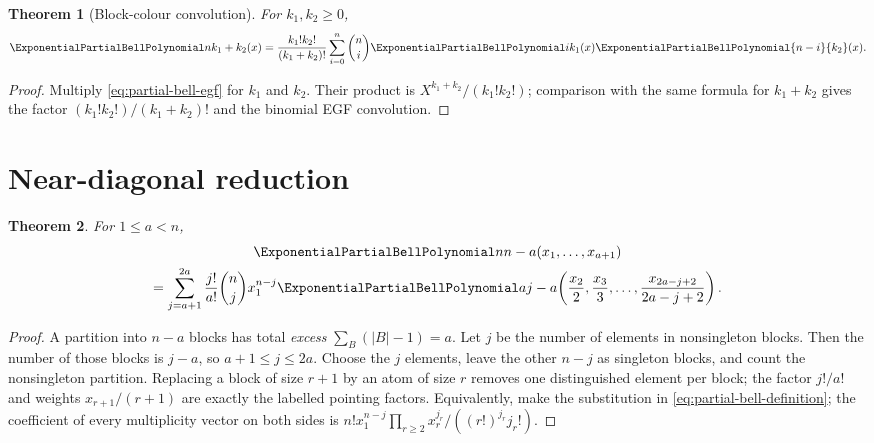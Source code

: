 \documentclass[11pt,a4paper,oneside,openany]{book}
\newtheorem{theorem}{Theorem}[chapter]
\theoremstyle{definition}
\theoremstyle{remark}
\begin{document}
\begin{theorem}[Block-colour convolution]\label{thm:bell-partial-convolution}
For $k_1,k_2\ge0$,
\begin{equation}\label{eq:bell-partial-convolution}
 \ExponentialPartialBellPolynomial n{k_1+k_2}(x)
 =\frac{k_1!k_2!}{(k_1+k_2)!}
 \sum_{i=0}^{n}\binom ni\ExponentialPartialBellPolynomial i{k_1}(x)\ExponentialPartialBellPolynomial{n-i}{k_2}(x).
\end{equation}
\end{theorem}
\begin{proof}
Multiply \eqref{eq:partial-bell-egf} for $k_1$ and $k_2$.  Their product is
$X^{k_1+k_2}/(k_1!k_2!)$; comparison with the same formula for $k_1+k_2$ gives the
factor $(k_1!k_2!)/(k_1+k_2)!$ and the binomial EGF convolution.
\end{proof}

\section{Near-diagonal reduction}
\begin{theorem}\label{thm:bell-near-diagonal}
For $1\le a<n$,
\begin{multline}\label{eq:bell-near-diagonal}
 \ExponentialPartialBellPolynomial n{n-a}(x_1,\ldots,x_{a+1})\\
 =\sum_{j=a+1}^{2a}\frac{j!}{a!}\binom nj x_1^{n-j}
 \ExponentialPartialBellPolynomial a{j-a}\!\left(\frac{x_2}{2},\frac{x_3}{3},\ldots,
 \frac{x_{2a-j+2}}{2a-j+2}\right).
\end{multline}
\end{theorem}
\begin{proof}
A partition into $n-a$ blocks has total \emph{excess}
$\sum_B(|B|-1)=a$.  Let $j$ be the number of elements in nonsingleton blocks.
Then the number of those blocks is $j-a$, so $a+1\le j\le2a$.  Choose the $j$
elements, leave the other $n-j$ as singleton blocks, and count the nonsingleton
partition.  Replacing a block of size $r+1$ by an atom of size $r$ removes one
distinguished element per block; the factor $j!/a!$ and weights $x_{r+1}/(r+1)$
are exactly the labelled pointing factors.  Equivalently, make the substitution in
\eqref{eq:partial-bell-definition}; the coefficient of every multiplicity vector
on both sides is
$n!x_1^{n-j}\prod_{r\ge2}x_r^{j_r}/((r!)^{j_r}j_r!)$.
\end{proof}
\end{document}
